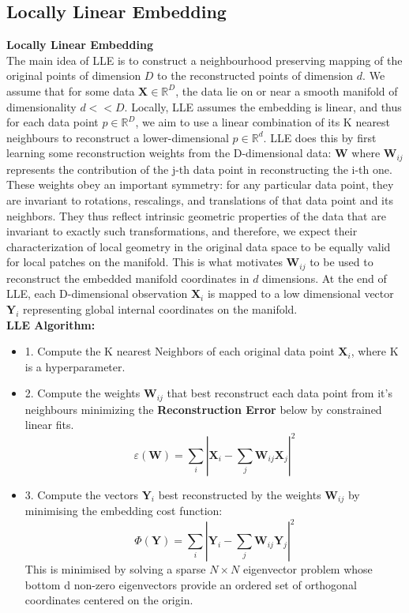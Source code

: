 \documentclass[12pt]{report}
\begin{document}
\newpage

\subsection{Locally Linear Embedding}

\textbf{Locally Linear Embedding}
\\
The main idea of LLE is to construct a neighbourhood preserving mapping 
of the original points of dimension $D$ to the reconstructed points of dimension $d$. 
We assume that for some data $\textbf{X} \in \mathbb{R}^{D}$, 
the data lie on or near a smooth manifold of dimensionality $d << D$. 
Locally, LLE assumes the embedding is linear, and thus for each data point $p \in \mathbb{R}^D$, 
we aim to use a linear combination of its K nearest neighbours to reconstruct a lower-dimensional $p \in \mathbb{R}^d$. 
LLE does this by first learning some reconstruction weights from the D-dimensional data: $\textbf{W}$ 
where $\textbf{W}_{ij}$ represents the contribution of the j-th data point in reconstructing the i-th one. 
These weights obey an important symmetry: for any particular data point, 
they are invariant to rotations, rescalings, and translations of that data point and its neighbors.
They thus reflect intrinsic geometric properties of the data that are invariant to exactly such transformations,
and therefore, we expect their characterization of local geometry in the 
original data space to be equally valid for local patches on the manifold.
This is what motivates $\textbf{W}_{ij}$ to be used to reconstruct
the embedded manifold coordinates in $d$ dimensions. 
At the end of LLE, each  D-dimensional observation $\textbf{X}_i$ 
is mapped to a low dimensional vector $\textbf{Y}_i$ 
representing global internal coordinates on the manifold.\\
\textbf{LLE Algorithm:}
\begin{itemize}
    \item 1. Compute the K nearest Neighbors of each original data point 
    $\textbf{X}_i$, where K is a hyperparameter.
    \item 2. Compute the weights $\textbf{W}_{ij}$ that best 
    reconstruct each data point from it's neighbours 
    minimizing the \textbf{Reconstruction Error} below by constrained linear fits.
$$\varepsilon (\textbf{W}) = \sum_i|\textbf{X}_i - \sum_j \textbf{W}_{ij} \textbf{X}_j|^2$$
    \item 3. Compute the vectors $\textbf{Y}_i$ best reconstructed by the weights $\textbf{W}_{ij}$ 
    by minimising the embedding cost function: 
    $$\Phi(\textbf{Y}) = \sum_i |\textbf{Y}_i - \sum_j \textbf{W}_{ij}\textbf{Y}_j|^2$$
    This is minimised by solving a sparse $N \times N$ 
    eigenvector problem whose bottom d non-zero eigenvectors provide
    an ordered set of orthogonal coordinates centered on the origin.
\end{itemize}
\end{document}
